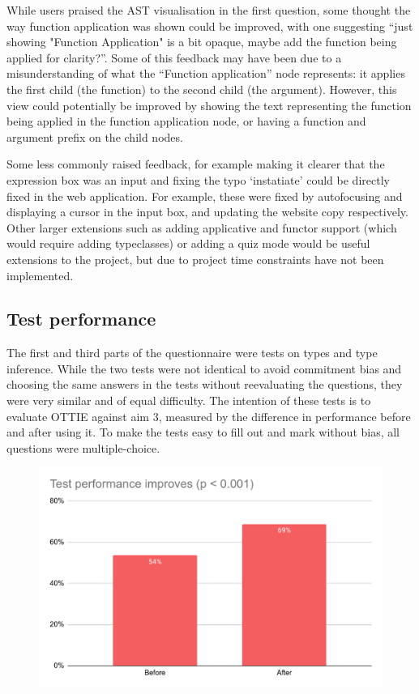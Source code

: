 \documentclass[a4paper,fleqn,oneside,12pt]{report}
\begin{document}
While users praised the AST visualisation in the first question, some thought the way function application was shown could be improved, with one suggesting “just showing "Function Application" is a bit opaque, maybe add the function being applied for clarity?”. Some of this feedback may have been due to a misunderstanding of what the “Function application” node represents: it applies the first child (the function) to the second child (the argument). However, this view could potentially be improved by showing the text representing the function being applied in the function application node, or having a function and argument prefix on the child nodes.

Some less commonly raised feedback, for example making it clearer that the expression box was an input and fixing the typo ‘instatiate’ could be directly fixed in the web application. For example, these were fixed by autofocusing and displaying a cursor in the input box, and updating the website copy respectively. Other larger extensions such as adding applicative and functor support (which would require adding typeclasses) or adding a quiz mode would be useful extensions to the project, but due to project time constraints have not been implemented.

\subsection{Test performance}\label{id:h.cn0p90nrqrmi}

The first and third parts of the questionnaire were tests on types and type inference. While the two tests were not identical to avoid commitment bias and choosing the same answers in the tests without reevaluating the questions, they were very similar and of equal difficulty. The intention of these tests is to evaluate OTTIE against aim 3, measured by the difference in performance before and after using it. To make the tests easy to fill out and mark without bias, all questions were multiple-choice.

{\centering \begin{figure}[h!]
  \centering
  \includegraphics[width=0.85\linewidth]{images/image23.png}
  \label{figure:evaluation_testperformanceimproves}
\end{figure} \par}
\end{document}
